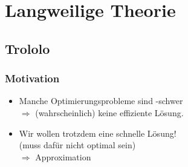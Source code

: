 

\section{Langweilige Theorie}
\subsection{Trololo}

\begin{frame}
	\frametitle{Motivation}
	
	\begin{itemize}
		\item Manche Optimierungsprobleme sind \classNP{}-schwer \\ $\Rightarrow$ (wahrscheinlich) keine effiziente Lösung. \pause
		\item Wir wollen trotzdem eine schnelle Lösung! \\ (muss dafür nicht optimal sein) \\ \pause $\Rightarrow$ Approximation

    \vspace{-1cm}
	\end{itemize}
\end{frame}

